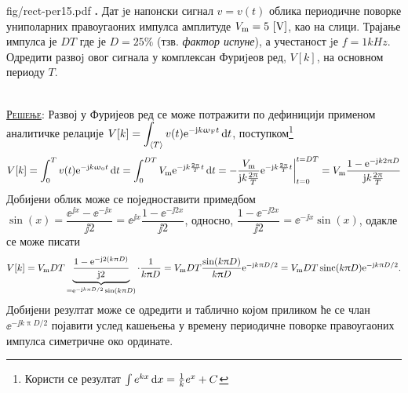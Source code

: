\begin{slikaDesno}{fig/rect-per15.pdf}
    \textbf{\ID.}\label{ID:rect_pulse_train_FS} 
    Дат jе напонски сигнал $v = v(t)$ облика периодичне поворке униполарних правоугаоних 
    импулса амплитуде ${V_{\rm m} = 5\,\left[\mathrm{V}\right]}$, као на слици. Трајање импулса је $DT$ где је 
$D = 25\%$ (тзв. \textit{фактор испуне}), а учестаност jе $f = 1\unit{kHz}$. 
Одредити развоj овог сигнала у комплексан Фуриjеов ред, $V[k]$, на основном периоду $T$.
\end{slikaDesno} \\

\textsc{\underline{Решење}}: Развој у Фуријеов ред се може потражити по дефиницији применом 
аналитичке релације 
$\displaystyle V[k] = \int_{\langle T \rangle} v(t) {\rm e}^{-{\rm j} k \upomega_{\rm F} t} \, {\rm d} t$, 
поступком\footnote{Користи се резултат $\int e^{kx} \, {\rm d} x = \frac{1}{k} e^x + C$}
\begin{align}
    V[k] = \int_{0}^T v(t) {\rm e}^{-{\rm j} k \upomega_{\rm 0} t} \, {\rm d} t 
         = \int_{0}^{DT}  V_{\rm m} {\rm e}^{-{\rm j} k \frac{2\uppi}{T} t} \, {\rm d} t
         = -\dfrac{V_{\rm m}}{{\rm j} k \frac{2\uppi}{T}} 
         {\rm e}^{-{\rm j} k \frac{2\uppi}{T} t}\bigg|_{t = 0}^{t = DT}
         = V_{\rm m}\dfrac{
            1
            -
            {\rm e}^{-{\rm j} k 2\uppi D}
         }{{\rm j} k \frac{2\uppi}{T}} 
\end{align}
Добијени облик може се поједноставити примедбом 
$\sin(x) = \dfrac{\ee^{\jj x} - \ee^{-\jj x}}{\jj 2} = \ee^{\jj x} \dfrac{1 - \ee^{-\jj 2x}}{\jj 2}$,
односно, 
$\dfrac{1 - \ee^{-\jj 2x}}{\jj 2} = \ee^{-\jj x} \sin(x) $,
одакле се може писати
\begin{align}
    V[k] = V_{\rm m}DT 
     \underbrace{
     \dfrac{
        1
        -
        {\rm e}^{-{\rm j} 2 (k \uppi D) }
     }{{\rm j} 2 }}_{ = {\rm e}^{-{\rm j} k \uppi D/2} \sin(k\uppi D) }
     \cdot 
     \dfrac{1}{k \uppi D} 
     = V_{\rm m} D T \dfrac{\sin(k\uppi D)}{k\uppi D} {\rm e}^{-{\rm j} k \uppi D/2} 
     = V_{\rm m} D T \operatorname{sinc}(k \uppi D) {\rm e}^{-{\rm j} k \uppi D/2}.
\end{align}
Добијени резултат може се одредити и таблично којом приликом ће се члан 
$\ee^{-\jj k \uppi D/2}$ појавити услед кашењења у времену периодичне поворке правоугаоних 
импулса симетричне око ординате. 
